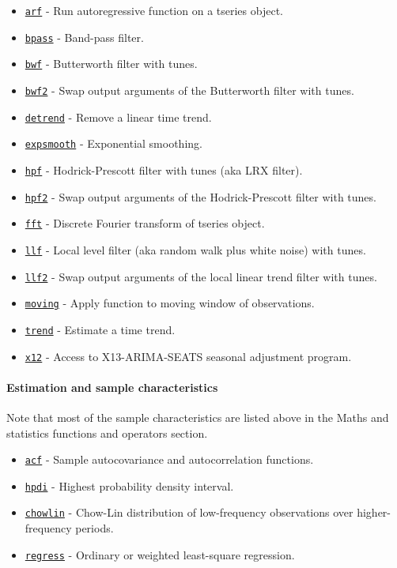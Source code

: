  \begin{itemize}
 \item
   \href{tseries/arf}{\texttt{arf}} - Run autoregressive function on a
   tseries object.
 \item
   \href{tseries/bpass}{\texttt{bpass}} - Band-pass filter.
 \item
   \href{tseries/bwf}{\texttt{bwf}} - Butterworth filter with tunes.
 \item
   \href{tseries/bwf2}{\texttt{bwf2}} - Swap output arguments of the
   Butterworth filter with tunes.
 \item
   \href{tseries/detrend}{\texttt{detrend}} - Remove a linear time trend.
 \item
   \href{tseries/expsmooth}{\texttt{expsmooth}} - Exponential smoothing.
 \item
   \href{tseries/hpf}{\texttt{hpf}} - Hodrick-Prescott filter with tunes
   (aka LRX filter).
 \item
   \href{tseries/hpf2}{\texttt{hpf2}} - Swap output arguments of the
   Hodrick-Prescott filter with tunes.
 \item
   \href{tseries/fft}{\texttt{fft}} - Discrete Fourier transform of
   tseries object.
 \item
   \href{tseries/llf}{\texttt{llf}} - Local level filter (aka random walk
   plus white noise) with tunes.
 \item
   \href{tseries/llf2}{\texttt{llf2}} - Swap output arguments of the
   local linear trend filter with tunes.
 \item
   \href{tseries/moving}{\texttt{moving}} - Apply function to moving
   window of observations.
 \item
   \href{tseries/trend}{\texttt{trend}} - Estimate a time trend.
 \item
   \href{tseries/x12}{\texttt{x12}} - Access to X13-ARIMA-SEATS seasonal
   adjustment program.
 \end{itemize}
 
 \paragraph{Estimation and sample characteristics}
 
 Note that most of the sample characteristics are listed above in the
 Maths and statistics functions and operators section.
 
 \begin{itemize}
 \item
   \href{tseries/acf}{\texttt{acf}} - Sample autocovariance and
   autocorrelation functions.
 \item
   \href{tseries/hpdi}{\texttt{hpdi}} - Highest probability density
   interval.
 \item
   \href{tseries/chowlin}{\texttt{chowlin}} - Chow-Lin distribution of
   low-frequency observations over higher-frequency periods.
 \item
   \href{tseries/regress}{\texttt{regress}} - Ordinary or weighted
   least-square regression.
 \end{itemize}
 
